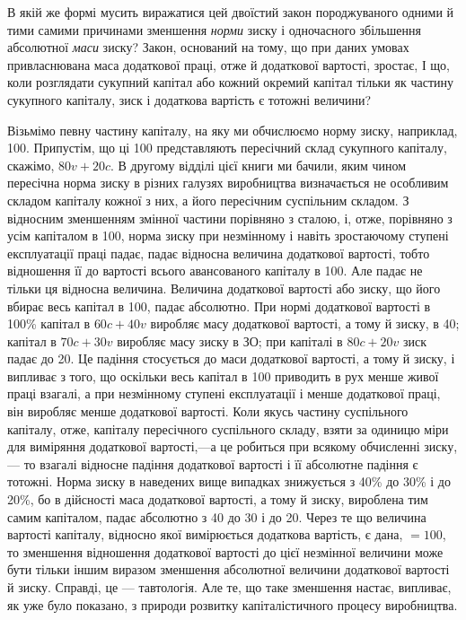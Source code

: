 \documentclass[12pt, a4paper, final]{memoir}
\begin{document}
В якій же формі мусить виражатися цей двоїстий закон породжуваного одними й тими самими причинами зменшення \emph{норми} зиску і одночасного збільшення абсолютної \emph{маси} зиску? Закон, оснований на тому, що при даних умовах привласнювана маса додаткової праці, отже й додаткової вартості, зростає, І що, коли розглядати сукупний капітал або кожний окремий капітал тільки як частину сукупного капіталу, зиск і додаткова вартість є тотожні величини?

Візьмімо певну частину капіталу, на яку ми обчислюємо норму зиску, наприклад, 100. Припустім, що ці 100 представляють пересічний склад сукупного капіталу, скажімо, $80v+20c$. В другому відділі цієї книги ми бачили, яким чином пересічна норма зиску в різних галузях виробництва визначається не особливим складом капіталу кожної з них, а його пересічним суспільним складом. З відносним зменшенням змінної частини порівняно з сталою, і, отже, порівняно з усім капіталом в 100, норма зиску при незмінному і навіть зростаючому ступені експлуатації праці падає, падає відносна величина додаткової вартості, тобто відношення її до вартості всього авансованого капіталу в 100. Але падає не тільки ця відносна величина. Величина додаткової вартості або зиску, що його вбирає весь капітал в 100, падає абсолютно. При нормі додаткової вартості в 100\% капітал в $60c + 40v$ виробляє масу додаткової вартості, а тому й зиску, в 40; капітал в $70c + 30v$ виробляє масу зиску в ЗО; при капіталі в $80c+20v$ зиск падає до 20. Це падіння стосується до маси додаткової вартості, а тому й зиску, і випливає з того, що оскільки весь капітал в 100 приводить в рух менше живої праці взагалі, а при незмінному ступені експлуатації і менше додаткової праці, він виробляє менше додаткової вартості. Коли якусь частину суспільного капіталу, отже, капіталу пересічного суспільного складу, взяти за одиницю міри для виміряння додаткової вартості,—а це робиться при всякому обчисленні зиску, — то взагалі відносне падіння додаткової вартості і її абсолютне падіння є тотожні. Норма зиску в наведених вище випадках знижується з 40\% до 30\% і до 20\%, бо в дійсності маса додаткової вартості, а тому й зиску, вироблена тим самим капіталом, падає абсолютно з 40 до 30 і до 20. Через те що величина вартості капіталу, відносно якої вимірюється додаткова вартість, є дана, $=100$, то зменшення відношення додаткової вартості до цієї незмінної величини може бути тільки іншим виразом зменшення абсолютної величини додаткової вартості й зиску. Справді, це — тавтологія. Але те, що таке зменшення настає, випливає, як уже було показано, з природи розвитку капіталістичного процесу виробництва.
\end{document}
